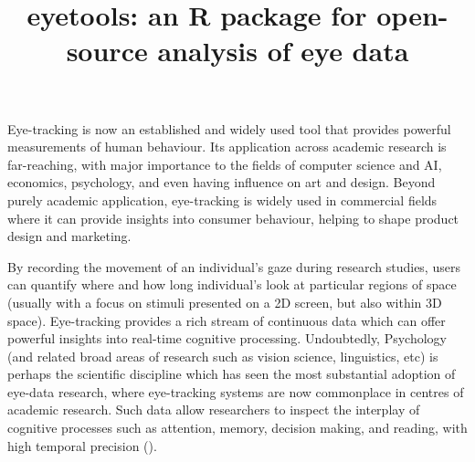 \documentclass[
  man,
  floatsintext,
  longtable,
  nolmodern,
  notxfonts,
  notimes,
  colorlinks=true,linkcolor=blue,citecolor=blue,urlcolor=blue]{apa7}
\title{eyetools: an R package for open-source analysis of eye data}
\affiliation{
{Lancaster University}}
\begin{document}
\maketitle


\setcounter{secnumdepth}{-\maxdimen} %

\setlength\LTleft{0pt}

\resetlinenumber[1]

Eye-tracking is now an established and widely used tool that provides
powerful measurements of human behaviour. Its application across
academic research is far-reaching, with major importance to the fields
of computer science and AI, economics, psychology, and even having
influence on art and design. Beyond purely academic application,
eye-tracking is widely used in commercial fields where it can provide
insights into consumer behaviour, helping to shape product design and
marketing.

By recording the movement of an individual's gaze during research
studies, users can quantify where and how long individual's look at
particular regions of space (usually with a focus on stimuli presented
on a 2D screen, but also within 3D space). Eye-tracking provides a rich
stream of continuous data which can offer powerful insights into
real-time cognitive processing. Undoubtedly, Psychology (and related
broad areas of research such as vision science, linguistics, etc) is
perhaps the scientific discipline which has seen the most substantial
adoption of eye-data research, where eye-tracking systems are now
commonplace in centres of academic research. Such data allow researchers
to inspect the interplay of cognitive processes such as attention,
memory, decision making, and reading, with high temporal precision
().
\end{document}
